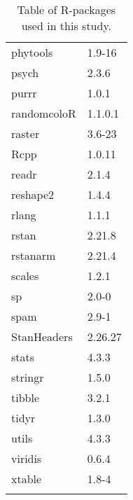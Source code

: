 \begin{longtable}{p{2.5cm}p{2.5cm}}
  phytools & 1.9-16 \\ 
  psych & 2.3.6 \\ 
  purrr & 1.0.1 \\ 
  randomcoloR & 1.1.0.1 \\ 
  raster & 3.6-23 \\ 
  Rcpp & 1.0.11 \\ 
  readr & 2.1.4 \\ 
  reshape2 & 1.4.4 \\ 
  rlang & 1.1.1 \\ 
  rstan & 2.21.8 \\ 
  rstanarm & 2.21.4 \\ 
  scales & 1.2.1 \\ 
  sp & 2.0-0 \\ 
  spam & 2.9-1 \\ 
  StanHeaders & 2.26.27 \\ 
  stats & 4.3.3 \\ 
  stringr & 1.5.0 \\ 
  tibble & 3.2.1 \\ 
  tidyr & 1.3.0 \\ 
  utils & 4.3.3 \\ 
  viridis & 0.6.4 \\ 
  xtable & 1.8-4 \\ 
   \bottomrule
\caption{Table of R-packages used in this study.} 
\label{appendix_r_package_table}
\end{longtable}
